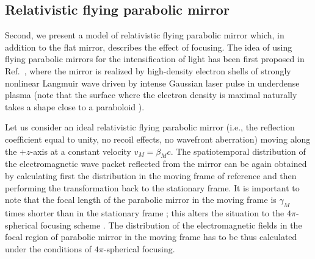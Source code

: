 \documentclass[10pt, a4paper, twoside, openright]{report}
\begin{document}
\subsection{Relativistic flying parabolic mirror\label{sec:rfpm}}


Second, we present a model of relativistic flying parabolic mirror which, in addition to the flat mirror, describes the effect of focusing. The idea of using flying parabolic mirrors for the intensification of light has been first proposed in Ref.~, where the mirror is realized by high-density electron shells of strongly nonlinear Langmuir wave driven by intense Gaussian laser pulse in underdense plasma (note that the surface where the electron density is maximal naturally takes a shape close to a paraboloid \cite{Bulanov1991, Bulanov1995, Matlis2006, Shadwick2002, Maksimchuk2008}).

Let us consider an ideal relativistic flying parabolic mirror (i.e., the reflection coefficient equal to unity, no recoil effects, no wavefront aberration) moving along the $ +z $-axis at a constant velocity $ v_M = \beta_M c $. The spatiotemporal distribution of the electromagnetic wave packet reflected from the mirror can be again obtained by calculating first the distribution in the moving frame of reference and then performing the transformation back to the stationary frame. It is important to note that the focal length of the parabolic mirror in the moving frame is $ \gamma_M $ times shorter than in the stationary frame \cite{Bulanov2011, Jeong2021}; this alters the situation to the $ 4 \pi $-spherical focusing scheme \cite{Gonoskov2012, Jeong2020}. The distribution of the electromagnetic fields in the focal region of parabolic mirror in the moving frame has to be thus calculated under the conditions of $ 4 \pi $-spherical focusing.
\end{document}
